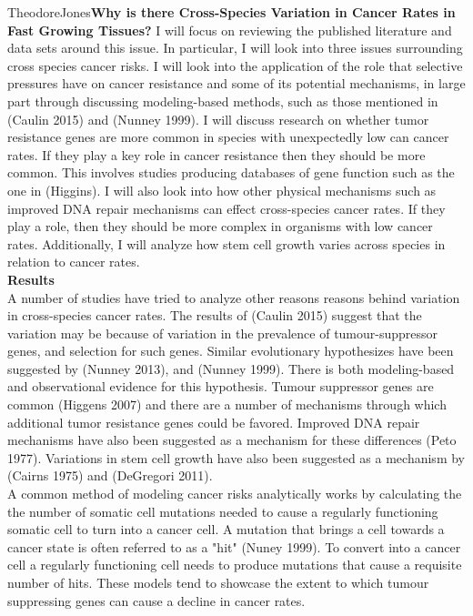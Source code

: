 \documentclass[12pt,letterpaper]{article}
\begin{document}
\begin{mla}{Theodore}{Jones}{}{}{}{\textbf{Why is there Cross-Species Variation in Cancer Rates in Fast Growing Tissues?}}
I will focus on reviewing the published literature and data sets around this issue. In particular, I will look into three issues surrounding cross species cancer risks.  I will look into the application of the role that selective pressures have on cancer resistance and some of its potential mechanisms, in large part through discussing modeling-based methods, such as those mentioned in (Caulin 2015) and (Nunney 1999). I will discuss research on whether tumor resistance genes are more common in species with unexpectedly low can cancer rates. If they play a key role in cancer resistance then they should be more common. This involves studies producing databases of gene function such as the one in (Higgins). I will also look into how other physical mechanisms such as improved DNA repair mechanisms can effect cross-species cancer rates. If they play a role, then they should be more complex in organisms with low cancer rates. Additionally, I will analyze how stem cell growth varies across species in relation to cancer rates.  \\

\noindent \textbf{Results} \\
A number of studies have tried to analyze other reasons reasons behind variation in cross-species cancer rates. The results of (Caulin 2015) suggest that the variation may be because of variation in the prevalence of tumour-suppressor genes, and selection for such genes. Similar evolutionary hypothesizes have been suggested by (Nunney 2013), and (Nunney 1999). There is both modeling-based and observational evidence for this hypothesis. Tumour suppressor genes are common (Higgens 2007) and there are a number of mechanisms through which additional tumor resistance genes could be favored. Improved DNA repair mechanisms have also been suggested as a mechanism for these differences (Peto 1977). Variations in stem cell growth have also been suggested as a mechanism by (Cairns 1975) and (DeGregori 2011). \\

A common method of modeling cancer risks analytically works by calculating the the number of somatic cell mutations needed to cause a regularly functioning somatic cell to turn into a cancer cell. A mutation that brings a cell towards a cancer state is often referred to as a "hit" (Nuney 1999). To convert into a cancer cell a regularly functioning cell needs to produce mutations that cause a requisite number of hits. These models tend to showcase the extent to which tumour suppressing genes can cause a decline in cancer rates. 


\end{mla}
\end{document}
